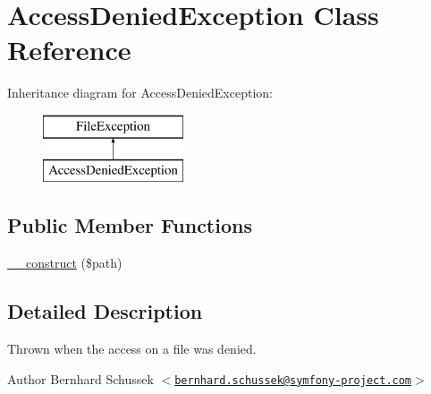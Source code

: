 \hypertarget{class_symfony_1_1_component_1_1_http_foundation_1_1_file_1_1_exception_1_1_access_denied_exception}{
\section{\-Access\-Denied\-Exception \-Class \-Reference}
\label{class_symfony_1_1_component_1_1_http_foundation_1_1_file_1_1_exception_1_1_access_denied_exception}
}
\-Inheritance diagram for \-Access\-Denied\-Exception\-:\begin{figure}[H]
\begin{center}
\leavevmode
\includegraphics[height=2.000000cm]{class_symfony_1_1_component_1_1_http_foundation_1_1_file_1_1_exception_1_1_access_denied_exception}
\end{center}
\end{figure}
\subsection*{\-Public \-Member \-Functions}
\begin{DoxyCompactItemize}
\item 
\hyperlink{class_symfony_1_1_component_1_1_http_foundation_1_1_file_1_1_exception_1_1_access_denied_exception_a03853ceaa393e487835b287de58aba5a}{\-\_\-\-\_\-construct} (\$path)
\end{DoxyCompactItemize}


\subsection{\-Detailed \-Description}
\-Thrown when the access on a file was denied.

\begin{DoxyAuthor}{\-Author}
\-Bernhard \-Schussek $<$\href{mailto:bernhard.schussek@symfony-project.com}{\tt bernhard.\-schussek@symfony-\/project.\-com}$>$ 
\end{DoxyAuthor}


